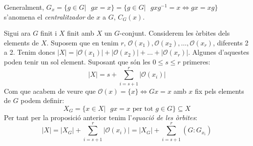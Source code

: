 \documentclass[a4paper,11pt]{report}
\newcommand{\inv}[1]{#1^{-1}}
\newcommand{\orb}{\mathcal{O}}
\theoremstyle{theorem}
\theoremstyle{definition}
\begin{document}
Generalment, $G_x=\{g\in G|\text{ }gx=x\}=\{g\in G| \text{ }gx\inv{g}=x\Leftrightarrow gx=xg\}$ s'anomena el \emph{centralitzador} de $x$ a $G$,  $C_G(x)$.

Sigui ara $G$ finit i $X$ finit amb $X$ un $G$-conjunt. Considerem les òrbites dels elements de $X$. Suposem que en tenim $r$, $\orb(x_1),\orb(x_2),\ldots,\orb(x_r)$, diferents 2 a 2. Tenim doncs $|X|=|\orb(x_1)|+|\orb(x_2)|+\ldots+|\orb(x_r)|$. Algunes d'aquestes poden tenir un sol element. Suposant que són les $0\leq s\leq r$ primeres:
$$|X|=s+\sum_{i=s+1}^{r}|\orb(x_i)|$$
Com que acabem de veure que $\orb(x)=\{x\}\Leftrightarrow Gx=x$ amb $x$ fix pels elements de $G$ podem definir:
$$X_G=\{x\in X|\text{ }gx=x\text{ per tot }g\in G\}\subseteq X$$
Per tant per la proposició anterior tenim l'\emph{equació de les òrbites}:
$$|X|=|X_G|+\sum_{i=s+1}^{r}|\orb(x_i)|=|X_G|+\sum_{i=s+1}^{r}(G:G_{x_i})$$
\end{document}
